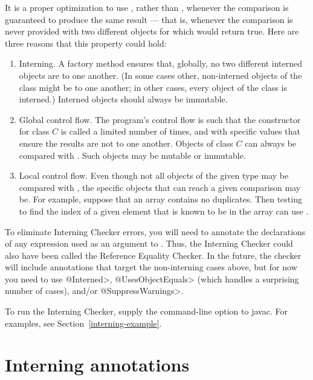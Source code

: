 It is a proper optimization to use \code{==}, rather than ,
whenever the comparison is guaranteed to produce the same result --- that
is, whenever the comparison is never provided with two different objects
for which  would return true.  Here are three reasons that
this property could hold:

\begin{enumerate}
\item
  Interning.  A factory method ensures that, globally, no two different
  interned objects are  to one another.  (In some cases
  other, non-interned objects of the class might be  to one
  another; in other cases, every object of the class is interned.)
  Interned objects should always be immutable.
\item
  Global control flow.  The program's control flow is such that the
  constructor for class $C$ is called a limited number of times, and with
  specific values that ensure the results are not  to one
  another.  Objects of class $C$ can always be compared with \code{==}.
  Such objects may be mutable or immutable.
\item
  Local control flow.  Even though not all objects of the given type may be
  compared with \code{==}, the specific objects that can reach a given
  comparison may be.  For example, suppose that an array contains no
  duplicates.  Then testing to find the index of a given element that is
  known to be in the array can use \code{==}.
\end{enumerate}

To eliminate Interning Checker errors, you will need to annotate the
declarations of any expression used as an argument to \code{==}.
Thus, the Interning Checker
could also have been called the Reference Equality Checker.  In the
future, the checker will include annotations that target the non-interning
cases above, but for now you need to use \<@Interned>, \<@UsesObjectEquals>
(which handles a surprising number of cases), and/or
\<@SuppressWarnings>.

To run the Interning Checker, supply the
command-line option to javac.  For examples, see Section~\ref{interning-example}.


\section{Interning annotations\label{interning-annotations}}

